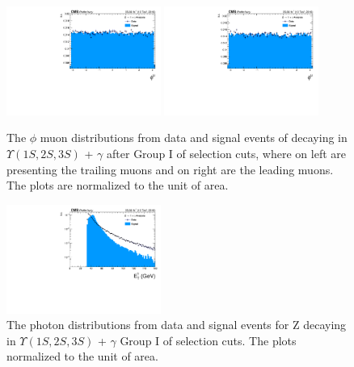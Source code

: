 \begin{figure}[!htbp]
\begin{center}
\includegraphics[width=0.45\textwidth]{figures/outputPlots/ZtoUpsilon_Cat0_ZZZZZ/au/data_x_mc/noKinCuts/h_noKin_TrailingMu_phi}\hspace*{1.cm}
\includegraphics[width=0.45\textwidth]{figures/outputPlots/ZtoUpsilon_Cat0_ZZZZZ/au/data_x_mc/noKinCuts/h_noKin_LeadingMu_phi}
\end{center}\vspace*{-.5cm}
\caption{The $\phi$ muon distributions from data and signal events of \Z decaying in $\Upsilon(1S,2S,3S)$ + $\gamma$ after Group I of selection cuts, where on left are presenting the trailing muons and on right are the leading muons. The plots are normalized to the unit of area.}
\label{fig:phiMuons_ZtoUpsilon_Cat0}
\end{figure}


\begin{figure}[!htbp]
\begin{center}
\includegraphics[width=0.45\textwidth]{figures/outputPlots/ZtoUpsilon_Cat0_ZZZZZ/au/data_x_mc/noKinCuts/h_noKin_Photon_pt}\hspace*{1.cm}
\end{center}\vspace*{-.5cm}
\caption{The \PT photon distributions from data and signal events for Z decaying in $\Upsilon(1S,2S,3S)$ + $\gamma$ Group I of selection cuts. The plots normalized to the unit of area.}
\label{fig:pTPhoton_ZtoUpsilon_Cat0}
\end{figure}


